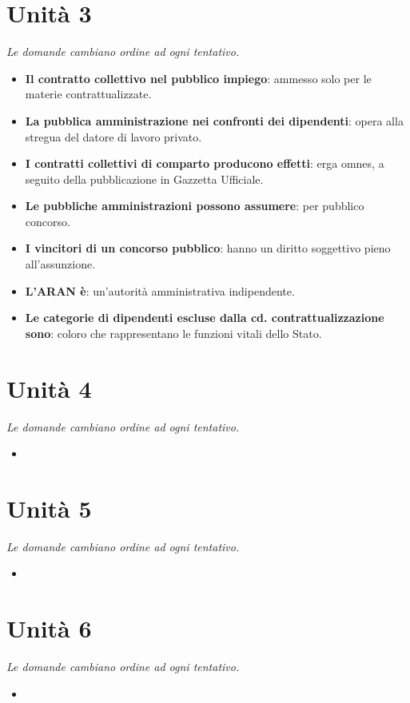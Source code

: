 \documentclass[12pt, a4paper]{report}
\begin{document}
\chapter{Unità 3}
    \textit{Le domande cambiano ordine ad ogni tentativo.}
    \begin{itemize}
        \item \textbf{Il contratto collettivo nel pubblico impiego}: ammesso solo per le materie contrattualizzate.
        \item \textbf{La pubblica amministrazione nei confronti dei dipendenti}: opera alla stregua del datore di lavoro privato.
        \item \textbf{I contratti collettivi di comparto producono effetti}: erga omnes, a seguito della pubblicazione in Gazzetta Ufficiale.
        \item \textbf{Le pubbliche amministrazioni possono assumere}: per pubblico concorso.
        \item \textbf{I vincitori di un concorso pubblico}: hanno un diritto soggettivo pieno all’assunzione.
        \item \textbf{L’ARAN è}: un’autorità amministrativa indipendente.
        \item \textbf{Le categorie di dipendenti escluse dalla cd. contrattualizzazione sono}: coloro che rappresentano le funzioni vitali dello Stato.
    \end{itemize}
\chapter{Unità 4}
    \textit{Le domande cambiano ordine ad ogni tentativo.}
    \begin{itemize}
        \item 
    \end{itemize}
\chapter{Unità 5}
    \textit{Le domande cambiano ordine ad ogni tentativo.}
    \begin{itemize}
        \item 
    \end{itemize}
\chapter{Unità 6}
    \textit{Le domande cambiano ordine ad ogni tentativo.}
    \begin{itemize}
        \item 
    \end{itemize}
\end{document}
